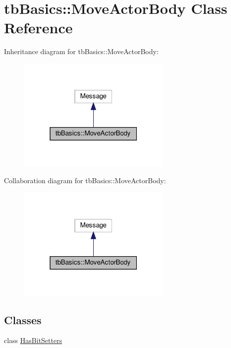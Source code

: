 \hypertarget{classtbBasics_1_1MoveActorBody}{}\section{tb\+Basics\+:\+:Move\+Actor\+Body Class Reference}
\label{classtbBasics_1_1MoveActorBody}


Inheritance diagram for tb\+Basics\+:\+:Move\+Actor\+Body\+:
\nopagebreak
\begin{figure}[H]
\begin{center}
\leavevmode
\includegraphics[width=211pt]{classtbBasics_1_1MoveActorBody__inherit__graph}
\end{center}
\end{figure}


Collaboration diagram for tb\+Basics\+:\+:Move\+Actor\+Body\+:
\nopagebreak
\begin{figure}[H]
\begin{center}
\leavevmode
\includegraphics[width=211pt]{classtbBasics_1_1MoveActorBody__coll__graph}
\end{center}
\end{figure}
\subsection*{Classes}
\begin{DoxyCompactItemize}
\item 
class \hyperlink{classtbBasics_1_1MoveActorBody_1_1HasBitSetters}{Has\+Bit\+Setters}
\end{DoxyCompactItemize}
